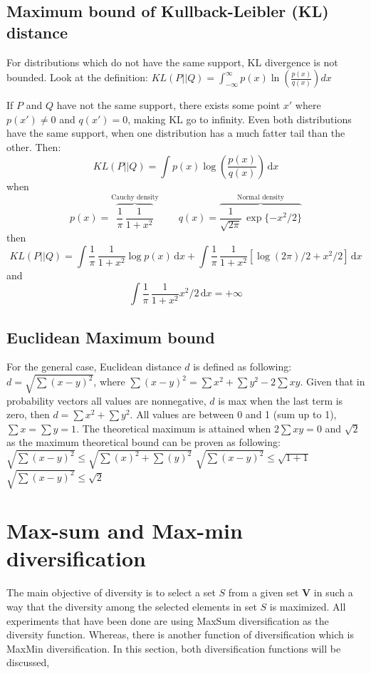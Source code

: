 \documentclass{article}
\begin{document}



\subsection{Maximum bound of Kullback-Leibler (KL) distance}

For distributions which do not have the same support, KL divergence is not bounded. Look at the definition: $KL(P\vert\vert Q) = \int_{-\infty}^{\infty} p(x)\ln\left(\frac{p(x)}{q(x)}\right) dx$

If $ P $ and $ Q $ have not the same support, there exists some point $x'$ where $p(x') \neq 0$ and $q(x') = 0$, making KL go to infinity. Even both distributions have the same support, when one distribution has a much fatter tail than the other. Then:
$$KL(P\vert\vert Q) = \int p(x)\log\left(\frac{p(x)}{q(x)}\right) \,\text{d}x$$
when
$$p(x)=\overbrace{\frac{1}{\pi}\,\frac{1}{1+x^2}}^\text{Cauchy density}\qquad q(x)=\overbrace{\frac{1}{\sqrt{2\pi}}\,\exp\{-x^2/2\}}^\text{Normal density}$$
then
$$KL(P\vert\vert Q) = \int \frac{1}{\pi}\,\frac{1}{1+x^2} \log p(x) \,\text{d}x + \int \frac{1}{\pi}\,\frac{1}{1+x^2} [\log(2\pi)/2+x^2/2]\,\text{d}x$$
and
$$\int \frac{1}{\pi}\,\frac{1}{1+x^2} x^2/2\,\text{d}x=+\infty$$


\subsection{Euclidean Maximum bound}
For the general case, Euclidean distance $d$ is defined as following: 
$d = \sqrt{\sum{(x-y)^2}}$, where $ \sum{(x-y)^2} = \sum x^2 + \sum y^2 - 2\sum xy$. Given that in probability vectors all values are nonnegative, $d$ is max when the last term is zero, then $d = \sum x^2 + \sum y^2$. All values are between 0 and 1 (sum up to 1), $\sum x = \sum y = 1$. The theoretical maximum is attained when $2\sum xy = 0$ and $\sqrt{2}$ as the maximum theoretical bound can be proven as following: 
\newline
$ \sqrt{\sum{(x-y)^2}} \leq \sqrt{\sum{(x)^2} + \sum{(y)^2}} $
\newline
$ \sqrt{\sum{(x-y)^2}} \leq \sqrt{1 + 1} $
\newline
$ \sqrt{\sum{(x-y)^2}} \leq \sqrt{2} $


\section{Max-sum and Max-min diversification}
The main objective of diversity is to select a set $ S $  from a given set $ \mathbf{V} $ in such a way that the diversity among the selected elements in set $ S $ is maximized. All experiments that have been done are using MaxSum diversification as the diversity function. Whereas, there is another function of diversification which is MaxMin diversification. In this section, both diversification functions will be discussed, 
\end{document}
